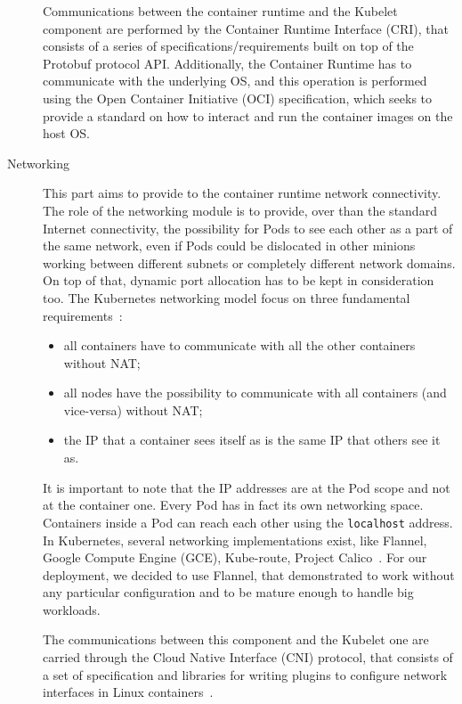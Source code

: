 \begin{description}
  Communications between the container runtime and the Kubelet component are
  performed by the Container Runtime Interface (CRI), that consists of a series
  of specifications/requirements built on top of the Protobuf protocol API.
  Additionally, the Container Runtime has to communicate with the underlying OS,
  and this operation is performed using the Open Container Initiative (OCI)
  specification, which seeks to provide a standard on how to interact and run
  the container images on the host OS.
\item[Networking] This part aims to provide to the container runtime network
  connectivity. The role of the networking module is to provide, over than the
  standard Internet connectivity, the possibility for Pods to see each other as
  a part of the same network, even if Pods could be dislocated in other minions
  working between different subnets or completely different network domains. On
  top of that, dynamic port allocation has to be kept in consideration too. The
  Kubernetes networking model focus on three fundamental
  requirements~\cite{k8snetworkingwiki}:
  \begin{itemize}
  \item all containers have to communicate with all the other containers without
    NAT;
  \item all nodes have the possibility to communicate with all containers (and
    vice-versa) without NAT;
  \item the IP that a container sees itself as is the same IP that others see it
    as.
  \end{itemize}
  It is important to note that the IP addresses are at the Pod scope and not at
  the container one. Every Pod has in fact its own networking space. Containers
  inside a Pod can reach each other using the \verb!localhost! address. In
  Kubernetes, several networking implementations exist, like Flannel, Google
  Compute Engine (GCE), Kube-route, Project Calico~\cite{k8snetworkingwiki}. For
  our deployment, we decided to use Flannel, that demonstrated to work without
  any particular configuration and to be mature enough to handle big workloads.

  The communications between this component and the Kubelet one are carried
  through the Cloud Native Interface (CNI) protocol, that consists of a set
  of specification and libraries for writing plugins to configure network
  interfaces in Linux containers~\cite{cnigithub}.
\end{description}

